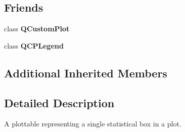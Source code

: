 \subsection*{Friends}
\begin{DoxyCompactItemize}
\item 
\hypertarget{class_q_c_p_statistical_box_a1cdf9df76adcfae45261690aa0ca2198}{}\label{class_q_c_p_statistical_box_a1cdf9df76adcfae45261690aa0ca2198} 
class {\bfseries Q\+Custom\+Plot}
\item 
\hypertarget{class_q_c_p_statistical_box_a8429035e7adfbd7f05805a6530ad5e3b}{}\label{class_q_c_p_statistical_box_a8429035e7adfbd7f05805a6530ad5e3b} 
class {\bfseries Q\+C\+P\+Legend}
\end{DoxyCompactItemize}
\subsection*{Additional Inherited Members}


\subsection{Detailed Description}
A plottable representing a single statistical box in a plot. 



